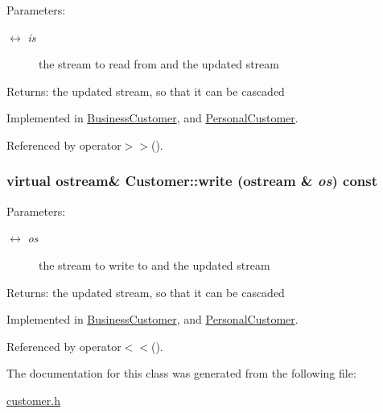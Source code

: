 \begin{Desc}
\item[Parameters:]
\begin{description}
\item[\mbox{$\leftrightarrow$} {\em is}]the stream to read from and the updated stream \end{description}
\end{Desc}
\begin{Desc}
\item[Returns:]the updated stream, so that it can be cascaded \end{Desc}


Implemented in \hyperlink{classBusinessCustomer_2c5cee8ad65d72e620a32f10e99b823d}{BusinessCustomer}, and \hyperlink{classPersonalCustomer_81861fd3353273de8c4da5f273ecfd26}{PersonalCustomer}.

Referenced by operator$>$$>$().\hypertarget{classCustomer_a4ef104426d09a4817cb2d55e5e674d0}{
\subsubsection[write]{\setlength{\rightskip}{0pt plus 5cm}virtual ostream\& Customer::write (ostream \& {\em os}) const}}
\label{classCustomer_a4ef104426d09a4817cb2d55e5e674d0}


\begin{Desc}
\item[Parameters:]
\begin{description}
\item[\mbox{$\leftrightarrow$} {\em os}]the stream to write to and the updated stream \end{description}
\end{Desc}
\begin{Desc}
\item[Returns:]the updated stream, so that it can be cascaded \end{Desc}


Implemented in \hyperlink{classBusinessCustomer_2ea38f4b72488c8e9d7f7c38ed93b454}{BusinessCustomer}, and \hyperlink{classPersonalCustomer_123975841172a6933c0358907d29f495}{PersonalCustomer}.

Referenced by operator$<$$<$().

The documentation for this class was generated from the following file:\begin{CompactItemize}
\item 
\hyperlink{customer_8h}{customer.h}\end{CompactItemize}
